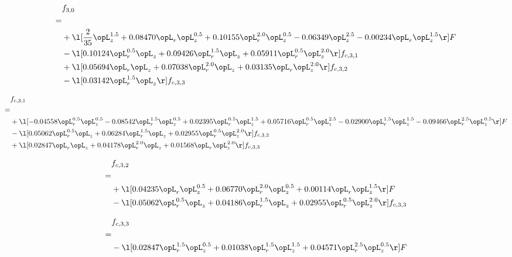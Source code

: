 \begin{alignat}{2} 
\label{eq:f_30_2} 
& f_{3,0} \nonumber \\ 
 = \\ 
& + \l[ \frac{2}{35} \opL_z^{1.5} +  0.08470 \opL_r \opL_z^{0.5} +  0.10155 \opL_r^{2.0} \opL_z^{0.5}   -0.06349 \opL_z^{2.5}   -0.00234 \opL_r \opL_z^{1.5}  \r] F \nonumber \\ 
& - \l[  0.10124 \opL_r^{0.5} \opL_z +  0.09426 \opL_r^{1.5} \opL_z +  0.05911 \opL_r^{0.5} \opL_z^{2.0}  \r] f_{c,3,1} \nonumber \\ 
& + \l[  0.05694 \opL_r \opL_z +  0.07038 \opL_r^{2.0} \opL_z +  0.03135 \opL_r \opL_z^{2.0}  \r] f_{c,3,2} \nonumber \\ 
& - \l[  0.03142 \opL_r^{1.5} \opL_z  \r] f_{c,3,3} \nonumber \\ 
\end{alignat} 


\begin{alignat}{2} 
\label{eq:f_31_2} 
& f_{c,3,1} \nonumber \\ 
 = \\ 
& + \l[  -0.04558 \opL_r^{0.5} \opL_z^{0.5}   -0.08542 \opL_r^{1.5} \opL_z^{0.5} +  0.02395 \opL_r^{0.5} \opL_z^{1.5} +  0.05716 \opL_r^{0.5} \opL_z^{2.5}   -0.02900 \opL_r^{1.5} \opL_z^{1.5}   -0.09466 \opL_r^{2.5} \opL_z^{0.5}  \r] F \nonumber \\ 
& - \l[  0.05062 \opL_r^{0.5} \opL_z +  0.06284 \opL_r^{1.5} \opL_z +  0.02955 \opL_r^{0.5} \opL_z^{2.0}  \r] f_{c,3,2} \nonumber \\ 
& + \l[  0.02847 \opL_r \opL_z +  0.04178 \opL_r^{2.0} \opL_z +  0.01568 \opL_r \opL_z^{2.0}  \r] f_{c,3,3} \nonumber \\ 
\end{alignat} 


\begin{alignat}{2} 
\label{eq:f_32_2} 
& f_{c,3,2} \nonumber \\ 
 = \\ 
& + \l[  0.04235 \opL_r \opL_z^{0.5} +  0.06770 \opL_r^{2.0} \opL_z^{0.5} +  0.00114 \opL_r \opL_z^{1.5}  \r] F \nonumber \\ 
& - \l[  0.05062 \opL_r^{0.5} \opL_z +  0.04186 \opL_r^{1.5} \opL_z +  0.02955 \opL_r^{0.5} \opL_z^{2.0}  \r] f_{c,3,3} \nonumber \\ 
\end{alignat} 


\begin{alignat}{2} 
\label{eq:f_33_2} 
& f_{c,3,3} \nonumber \\ 
 = \\ 
& - \l[  0.02847 \opL_r^{1.5} \opL_z^{0.5} +  0.01038 \opL_r^{1.5} \opL_z^{1.5} +  0.04571 \opL_r^{2.5} \opL_z^{0.5}  \r] F \nonumber \\ 
\end{alignat} 


